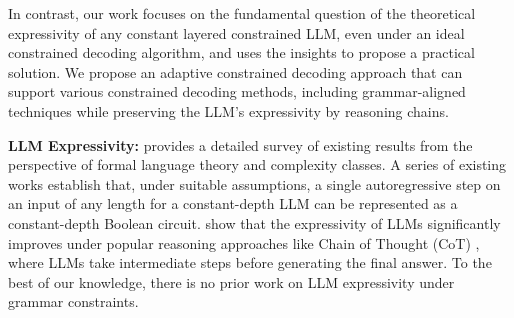 In contrast, our work focuses on the fundamental question of the theoretical expressivity of any constant layered constrained LLM, even under an ideal constrained decoding algorithm, and uses the insights to propose a practical solution.
We propose an adaptive constrained decoding approach that can support various constrained decoding methods, including grammar-aligned techniques while preserving the LLM's expressivity by reasoning chains.

\textbf{LLM Expressivity:} \cite{survey} provides a detailed survey of existing results from the perspective of formal language theory and complexity classes. A series of existing works \cite{circuit1, cicuit2, circuit3, tc0} establish that, under suitable assumptions, a single autoregressive step on an input of any length for a constant-depth LLM can be represented as a constant-depth Boolean circuit. \cite{expressivity1, expressivity2} show that the expressivity of LLMs significantly improves under popular reasoning approaches like Chain of Thought (CoT) \cite{cotGoogle}, where LLMs take intermediate steps before generating the final answer. To the best of our knowledge, there is no prior work on LLM expressivity under grammar constraints.

